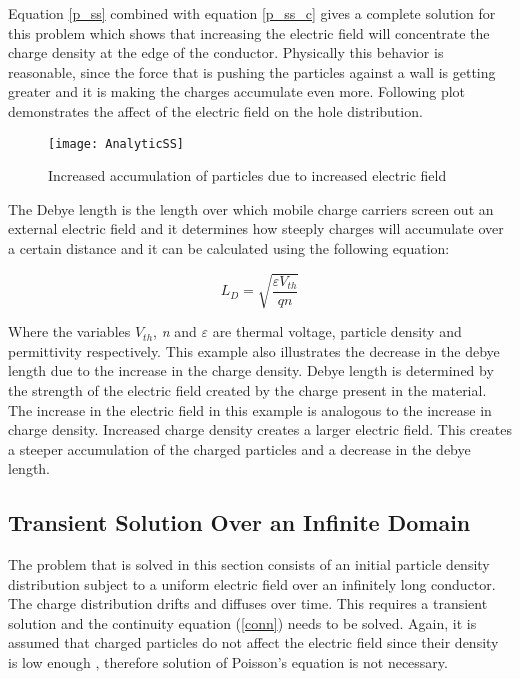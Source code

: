 \begin{doublespace}
Equation \ref{p_ss} combined with equation \ref{p_ss_c} gives a complete solution for this problem which shows that increasing the electric field will concentrate the charge density at the edge of the conductor. Physically this behavior is reasonable, since the force that is pushing the particles against a wall is getting greater and it is making the charges accumulate even more. Following plot demonstrates the affect of the electric field on the hole distribution.

\begin{figure}[!htp]
\centering
\texttt{[image: AnalyticSS]}
\caption{Increased accumulation of particles due to increased electric field} 
\end{figure}

The Debye length is the length over which mobile charge carriers screen out an external electric field and it determines how steeply charges will accumulate over a certain distance and it can be calculated using the following equation\cite{Dragica1}:

\begin{equation}
L_D=\sqrt{\frac{\varepsilon V_{th}}{q n}}
\end{equation}

Where the variables \textit{$V_{th}$}, \textit{n} and \textit{$\varepsilon$} are thermal voltage, particle density and permittivity respectively. This example also illustrates the decrease in the debye length due to the increase in the charge density. Debye length is determined by the strength of the electric field created by the charge present in the material. The increase in the electric field in this example is analogous to the increase in charge density. Increased charge density creates a larger electric field. This creates a steeper accumulation of the charged particles and a decrease in the debye length. 

\clearpage
\subsection{Transient Solution Over an Infinite Domain}

The problem that is solved in this section consists of an initial particle density distribution subject to a uniform electric field over an infinitely long conductor. The charge distribution drifts and diffuses over time. This requires a transient solution and the continuity equation (\ref{conn}) needs to be solved. Again, it is assumed that charged particles do not affect the electric field since their density is low enough , therefore solution of Poisson's equation is not necessary. 


\end{doublespace}
